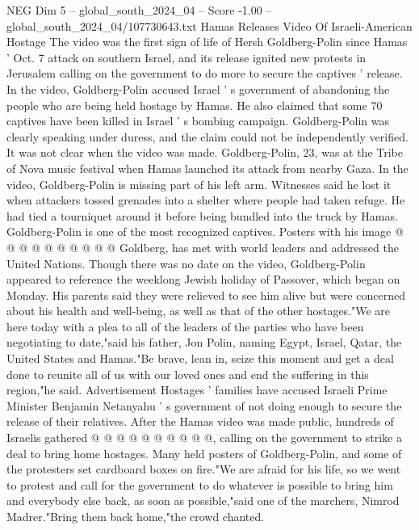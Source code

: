 \begin{textsample}{NEG Dim 5 – global\_south\_2024\_04 – Score -1.00 – global\_south\_2024\_04/107730643.txt}  \label{ex:f5_neg_180}
Hamas Releases Video Of Israeli-American Hostage The video was the first sign of life of Hersh Goldberg-Polin since Hamas ' Oct. 7 attack on southern Israel, and its release ignited new protests in Jerusalem calling on the government to do more to secure the captives ' release.
In the video, Goldberg-Polin accused Israel ' s government of abandoning the people who are being held hostage by Hamas.
He also claimed that some 70 captives have been killed in Israel ' s bombing campaign.
Goldberg-Polin was clearly speaking under duress, and the claim could not be independently verified.
It was not clear when the video was made.
Goldberg-Polin, 23, was at the Tribe of Nova music festival when Hamas launched its attack from nearby Gaza.
In the video, Goldberg-Polin is missing part of his left arm.
Witnesses said he lost it when attackers tossed grenades into a shelter where people had taken refuge.
He had tied a tourniquet around it before being bundled into the truck by Hamas.
Goldberg-Polin is one of the most recognized captives.
Posters with his image @ @ @ @ @ @ @ @ @ @ Goldberg, has met with world leaders and addressed the United Nations.
Though there was no date on the video, Goldberg-Polin appeared to reference the weeklong Jewish holiday of Passover, which began on Monday.
His parents said they were relieved to see him alive but were concerned about his health and well-being, as well as that of the other hostages."We are here today with a plea to all of the leaders of the parties who have been negotiating to date,"said his father, Jon Polin, naming Egypt, Israel, Qatar, the United States and Hamas."Be brave, lean in, seize this moment and get a deal done to reunite all of us with our loved ones and end the suffering in this region,"he said.
Advertisement Hostages ' families have accused Israeli Prime Minister Benjamin Netanyahu ' s government of not doing enough to secure the release of their relatives.
After the Hamas video was made public, hundreds of Israelis gathered @ @ @ @ @ @ @ @ @ @, calling on the government to strike a deal to bring home hostages.
Many held posters of Goldberg-Polin, and some of the protesters set cardboard boxes on fire."We are afraid for his life, so we went to protest and call for the government to do whatever is possible to bring him and everybody else back, as soon as possible,"said one of the marchers, Nimrod Madrer."Bring them back home,"the crowd chanted.

\end{textsample}
